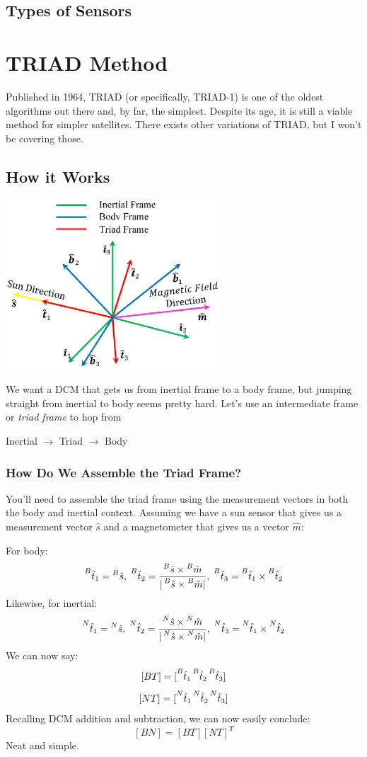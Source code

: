 \documentclass[a4paper,14pt]{extreport}
\newcommand{\ps}[2]{\prescript{#2}{}{\hat{#1}}}
\begin{document}
\section{Types of Sensors}

\chapter{TRIAD Method}
Published in 1964, TRIAD (or specifically, TRIAD-1) is one of the oldest algorithms out there and, by far, the simplest. Despite its age, it is still a viable method for simpler satellites. There exists other  variations of TRIAD, but I won't be covering those.

\section{How it Works}
\begin{center}
\includegraphics[width=8cm]{triad}
\end{center}
We want a DCM that gets us from inertial frame to a body frame, but jumping straight from inertial to body seems pretty hard. Let's use an intermediate frame or \emph{triad frame} to hop from 
\begin{center}Inertial $\rightarrow$ Triad $\rightarrow$ Body\end{center}
\subsection{How Do We Assemble the Triad Frame?}
You'll need to assemble the triad frame using the measurement vectors in both the body and inertial context. Assuming we have a sun sensor that gives us a measurement vector $\hat{s}$ and a magnetometer that gives us a vector $\hat{m}$:
\begin{center}
For body:
\[
\ps{t}{B}_1=\ps{s}{B},\;\ps{t}{B}_2=\dfrac{\ps{s}{B}\times\ps{m}{B}}{|\ps{s}{B}\times\ps{m}{B}|},\;\ps{t}{B}_3 = \ps{t}{B}_1\times\ps{t}{B}_2
\]
Likewise, for inertial:
\[
\ps{t}{N}_1=\ps{s}{N},\;\ps{t}{N}_2=\dfrac{\ps{s}{N}\times\ps{m}{N}}{|\ps{s}{N}\times\ps{m}{N}|},\;\ps{t}{N}_3 = \ps{t}{N}_1\times\ps{t}{N}_2
\]
We can now say:
\[
[BT]=[\ps{t}{B}_1 \ps{t}{B}_2 \ps{t}{B}_3]
\]
\[
[NT]=[\ps{t}{N}_1 \ps{t}{N}_2 \ps{t}{N}_3]
\]
Recalling DCM addition and subtraction, we can now easily conclude:
\[
[BN] = [BT][NT]^T
\]
Neat and simple.
\end{center}
\end{document}
